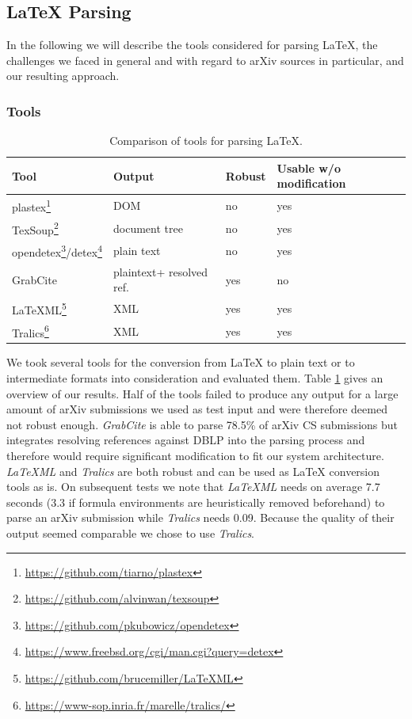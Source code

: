 \subsection{\LaTeX{} Parsing}
In the following we will describe the tools considered for parsing \LaTeX{}, the challenges we faced in general and with regard to arXiv sources in particular, and our resulting approach.

\subsubsection{Tools}

\begin{table}[t]
\centering
  \caption{Comparison of tools for parsing \LaTeX{}.}
  \label{tbl:tools}
\begin{tabular}{llll}
\toprule
    Tool & Output & Robust & Usable w/o modification \\
   \midrule
    plastex\footnote{\url{https://github.com/tiarno/plastex}} & DOM & no & yes\\
    TexSoup\footnote{\url{https://github.com/alvinwan/texsoup}} & document tree & no & yes\\
    opendetex\footnote{\url{https://github.com/pkubowicz/opendetex}}/detex\footnote{\url{https://www.freebsd.org/cgi/man.cgi?query=detex}} & plain text & no & yes\\
    GrabCite\cite{Faerber2018} & plain\hphantom{ }text\hphantom{ }+ resolved ref. & yes & no\\
    LaTeXML\footnote{\url{https://github.com/brucemiller/LaTeXML}} & XML & yes & yes\\
    Tralics\footnote{\url{https://www-sop.inria.fr/marelle/tralics/}} & XML & yes & yes\\
  \bottomrule
\end{tabular}
\end{table}

We took several tools for the conversion from \LaTeX{} to plain text or to intermediate formats into consideration and evaluated them. Table \ref{tbl:tools} gives an overview of our results. Half of the tools failed to produce any output for a large amount of arXiv submissions we used as test input and were therefore deemed not robust enough. \textit{GrabCite} is able to parse 78.5\% of arXiv CS submissions but integrates resolving references against DBLP into the parsing process and therefore would require significant modification to fit our system architecture. \textit{LaTeXML} and \textit{Tralics} are both robust and can be used as \LaTeX{} conversion tools as is. On subsequent tests we note that \textit{LaTeXML} needs on average 7.7 seconds (3.3 if formula environments are heuristically removed beforehand) to parse an arXiv submission while \textit{Tralics} needs 0.09. Because the quality of their output seemed comparable we chose to use \textit{Tralics}.

